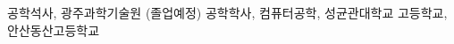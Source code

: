 %
%
%


\begin{scholarship}
	{공학석사, 광주과학기술원 (졸업예정)}
					{공학학사, 컴퓨터공학, 성균관대학교}
					{고등학교, 안산동산고등학교}
\end{scholarship}
